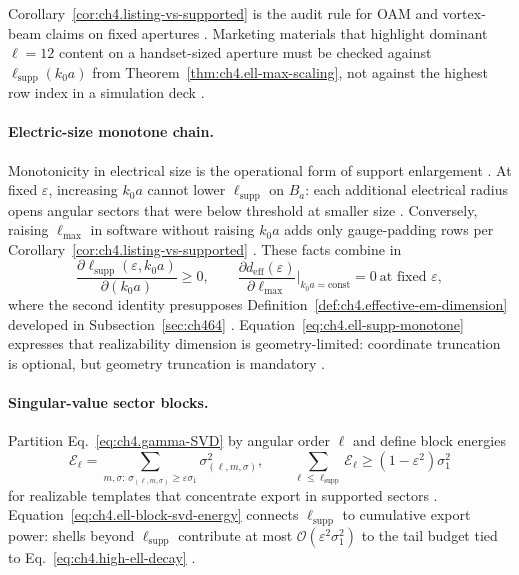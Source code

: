 Corollary~\ref{cor:ch4.listing-vs-supported} is the audit rule for OAM and vortex-beam claims on fixed apertures \cite{devaney2004}.
Marketing materials that highlight dominant \(\ell=12\) content on a handset-sized aperture must be checked against
\(\ell_{\mathrm{supp}}(k_{0}a)\) from Theorem~\ref{thm:ch4.ell-max-scaling}, not against the highest row index in a simulation deck
\cite{hansen1988,jackson1999,harrington2001}.

\paragraph{Electric-size monotone chain.}
Monotonicity in electrical size is the operational form of support enlargement \cite{jackson1999,stratton1941}. At fixed
\(\varepsilon\), increasing \(k_{0}a\) cannot lower \(\ell_{\mathrm{supp}}\) on \(B_{a}\): each additional electrical radius opens
angular sectors that were below threshold at smaller size \cite{hansen1988,harrington2001}. Conversely, raising \(\ell_{\max}\) in
software without raising \(k_{0}a\) adds only gauge-padding rows per Corollary~\ref{cor:ch4.listing-vs-supported}
\cite{devaney2004,stratton1941}. These facts combine in
\begin{equation}
\label{eq:ch4.ell-supp-monotone}
\frac{\partial\ell_{\mathrm{supp}}(\varepsilon,k_{0}a)}{\partial(k_{0}a)}\ge0,\qquad
\frac{\partial d_{\mathrm{eff}}(\varepsilon)}{\partial\ell_{\max}}\Big|_{k_{0}a=\mathrm{const}}=0
\ \text{at fixed }\varepsilon,
\end{equation}
where the second identity presupposes Definition~\ref{def:ch4.effective-em-dimension} developed in Subsection~\ref{sec:ch464}
\cite{hansen1988,harrington2001,devaney2004}. Equation~\eqref{eq:ch4.ell-supp-monotone} expresses that realizability dimension is
geometry-limited: coordinate truncation is optional, but geometry truncation is mandatory \cite{stratton1941}.

\paragraph{Singular-value sector blocks.}
Partition Eq.~\eqref{eq:ch4.gamma-SVD} by angular order \(\ell\) and define block energies
\begin{equation}
\label{eq:ch4.ell-block-svd-energy}
\mathcal{E}_{\ell}
=
\sum_{m,\sigma:\,\sigma_{(\ell,m,\sigma)}\ge\varepsilon\sigma_{1}}
\sigma_{(\ell,m,\sigma)}^{2},
\qquad
\sum_{\ell\le\ell_{\mathrm{supp}}}\mathcal{E}_{\ell}
\ge
(1-\varepsilon^{2})\sigma_{1}^{2}
\end{equation}
for realizable templates that concentrate export in supported sectors \cite{harrington2001,hansen1988}. Equation~\eqref{eq:ch4.ell-block-svd-energy}
connects \(\ell_{\mathrm{supp}}\) to cumulative export power: shells beyond \(\ell_{\mathrm{supp}}\) contribute at most
\(\mathcal{O}(\varepsilon^{2}\sigma_{1}^{2})\) to the tail budget tied to Eq.~\eqref{eq:ch4.high-ell-decay}
\cite{devaney2004,stratton1941,jackson1999}.


